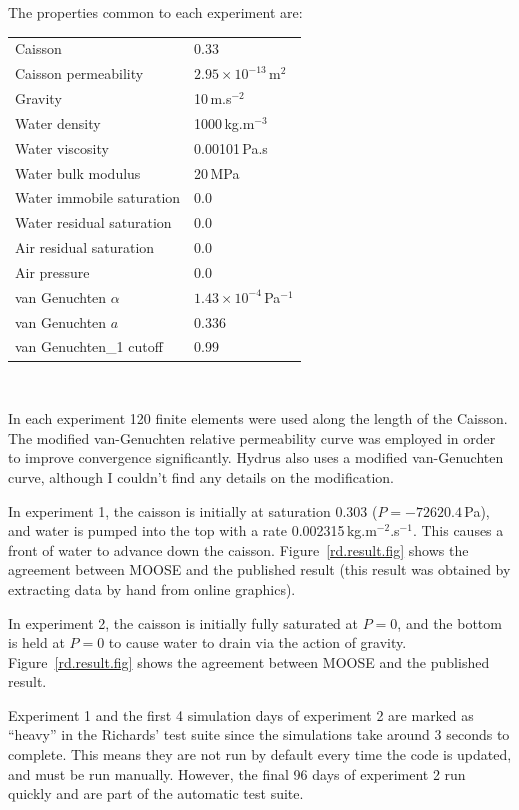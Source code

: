 \documentclass[]{scrreprt}
\begin{document}
The properties common to each experiment
are:
\begin{center}
\begin{tabular}{|ll|}
\hline
Caisson & 0.33 \\
Caisson permeability & $2.95\times 10^{-13}$\,m$^{2}$ \\
\hline
Gravity & 10\,m.s$^{-2}$ \\
\hline
Water density & 1000\,kg.m$^{-3}$ \\
Water viscosity & 0.00101\,Pa.s \\
Water bulk modulus & 20\,MPa \\
Water immobile saturation & 0.0 \\
Water residual saturation & 0.0 \\
Air residual saturation & 0.0 \\
Air pressure & 0.0 \\
\hline
van Genuchten $\alpha$ & $1.43\times 10^{-4}$\,Pa$^{-1}$ \\
van Genuchten $a$ & 0.336 \\
van Genuchten\_1 cutoff & 0.99 \\
\hline
\end{tabular} \\
\end{center}
In each experiment 120 finite elements were used along the length of
the Caisson.  The modified van-Genuchten relative permeability curve
was employed in order to improve convergence significantly.  Hydrus
also uses a modified van-Genuchten curve, although I couldn't find any
details on the modification.

In experiment 1, the caisson is initially at saturation 0.303
($P=-72620.4$\,Pa), and water is pumped into the top with a rate
0.002315\,kg.m$^{-2}$.s$^{-1}$.  This causes a front of water to
advance down the caisson.  Figure~\ref{rd.result.fig} shows the
agreement between MOOSE and the published result (this result was
obtained by extracting data by hand from online graphics).

In experiment 2, the caisson is initially fully saturated at $P=0$,
and the bottom is held at $P=0$ to cause water to drain via the action
of gravity.  Figure~\ref{rd.result.fig} shows the agreement between
MOOSE and the published result.

Experiment 1 and the first 4 simulation days of experiment 2 are
marked as ``heavy'' in the Richards' test suite since the simulations
take around 3 seconds to complete.  This means they are not run by
default every time the code is updated, and must be run manually.
However, the final 96 days of experiment 2 run quickly and are part of
the automatic test suite.
\end{document}
